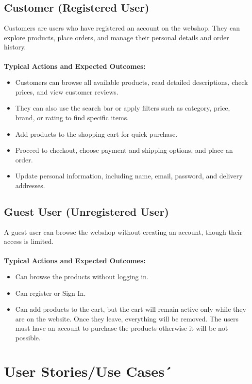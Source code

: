 \documentclass[a4paper,12pt]{article.cls}
\begin{document}
	\subsection*{Customer (Registered User)}
Customers are users who have registered an account on the webshop. They can explore products, place orders, and manage their personal details and order history. \\ \\
	\textbf{Typical Actions and Expected Outcomes:}
	\begin{itemize}
  		\item Customers can browse all available products, read detailed descriptions, check prices, and view customer reviews.
    		\item They can also use the search bar or apply filters such as category, price, brand, or rating to find specific items.
    		\item Add products to the shopping cart for quick purchase.
    		\item Proceed to checkout, choose payment and shipping options, and place an order.
    		\item Update personal information, including name, email, password, and delivery addresses.
	\end{itemize}

	\subsection*{Guest User (Unregistered User)}
	A guest user can browse the webshop without creating an account, though their access is limited. \\ \\
	\textbf{Typical Actions and Expected Outcomes:}
	\begin{itemize}
		\item Can browse the products without logging in.
		\item Can register or Sign In.
		\item Can add products to the cart, but the cart will remain active only while they are on the website. Once they leave, everything will be removed. The users must have an account to purchase the products otherwise it will be not possible.
	\end{itemize}
	\section{User Stories/Use Cases´}
\end{document}
